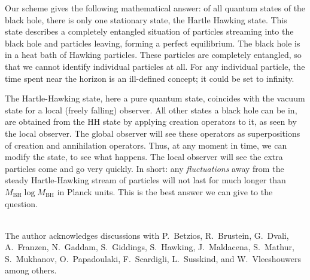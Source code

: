 \documentclass[12pt]{article}
\def\BH{{\mathrm{BH}}}\def\Pl{{\mathrm{Pl}}}\def\inn{{\mathrm{in}}} \def\outt{{\mathrm{out}}}
\begin{document}
Our scheme gives the following mathematical answer: of all quantum states of the black hole, there is only one stationary state, the Hartle Hawking state. This state describes a completely entangled situation of particles streaming into the black hole and particles leaving, forming a perfect equilibrium. The black hole is in a heat bath of Hawking particles. These particles are completely entangled, so that we cannot identify individual particles at all. For any individual particle, the time spent near the horizon is an ill-defined concept; it could be set to infinity.

The Hartle-Hawking state, here a pure quantum state, coincides with the vacuum state for a local (freely falling) observer. All other states a black hole can be in, are obtained from the HH state by applying creation operators to it, as seen by the local observer. The global observer will see these operators as superpositions of creation and annihilation operators. Thus, at any moment in time, we can modify the state, to see what happens. The local observer will see the extra particles come and go very quickly. In short: any \emph{fluctuations} away from the steady Hartle-Hawking stream of particles will not last for much longer than \(M_\BH\log M_\BH\) in Planck units. This is the best answer we can give to the question. 


\vskip15pt 
 \\

The author acknowledges discussions with P.~Betzios, R.~Brustein, G.~Dvali,  A.~Franzen,  N.~Gaddam,  S.~Giddings, S.~Hawking, J.~Maldacena, S.~Mathur, S.~Mukhanov, O.~Papadoulaki, F.~Scardigli, L.~Susskind, and W.~Vleeshouwers among others.
	
\end{document}
